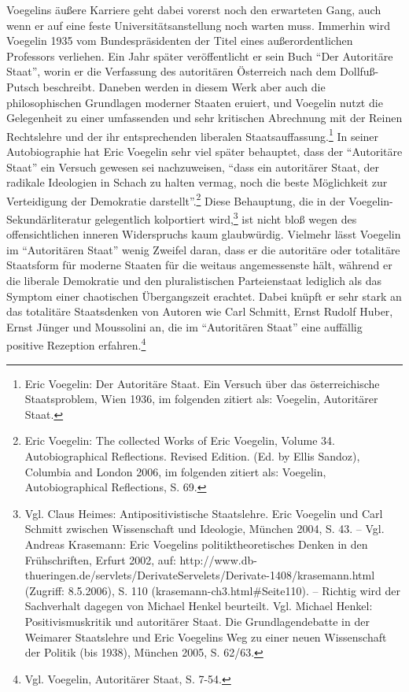\documentclass[12pt,a4paper,ngerman]{article}
\begin{document}
Voegelins äußere Karriere geht dabei vorerst noch den erwarteten Gang, auch
wenn er auf eine feste Universitätsanstellung noch warten muss.
Immerhin wird Voegelin 1935 vom Bundespräsidenten der Titel eines
außerordentlichen Professors verliehen. Ein Jahr später veröffentlicht er
sein Buch "`Der Autoritäre Staat"', worin er die Verfassung des autoritären
Österreich nach dem Dollfuß-Putsch beschreibt.  Daneben werden in diesem Werk
aber auch die philosophischen Grundlagen moderner Staaten eruiert, und
Voegelin nutzt die Gelegenheit zu einer umfassenden und sehr kritischen
Abrechnung mit der Reinen Rechtslehre und der ihr entsprechenden liberalen
Staatsauffassung.\footnote{Eric Voegelin: Der Autoritäre Staat.  Ein Versuch
  über das österreichische Staatsproblem, Wien 1936, im folgenden zitiert als:
  Voegelin, Autoritärer Staat.} In seiner Autobiographie hat Eric Voegelin
sehr viel später behauptet, dass der "`Autoritäre Staat"' ein Versuch gewesen
sei nachzuweisen, "`dass ein autoritärer Staat, der radikale Ideologien in
Schach zu halten vermag, noch die beste Möglichkeit zur Verteidigung der
Demokratie darstellt"'.\footnote{Eric Voegelin: The collected Works of Eric
  Voegelin, Volume 34.  Autobiographical Reflections. Revised Edition.  (Ed.
  by Ellis Sandoz), Columbia and London 2006, im folgenden zitiert als:
  Voegelin, Autobiographical Reflections, S. 69.} Diese Behauptung, die in der
Voegelin-Sekundärliteratur gelegentlich kolportiert wird,\footnote{Vgl.  Claus
  Heimes: Antipositivistische Staatslehre. Eric Voegelin und Carl Schmitt
  zwischen Wissenschaft und Ideologie, München 2004, S. 43. -- Vgl.  Andreas
  Krasemann: Eric Voegelins politiktheoretisches Denken in den Frühschriften,
  Erfurt 2002, auf:
  http://www.db-thueringen.de/servlets/DerivateServelets/Derivate-1408/krasemann.html
  (Zugriff: 8.5.2006), S. 110 (krasemann-ch3.html\#Seite110).  -- Richtig wird
  der Sachverhalt dagegen von Michael Henkel beurteilt.  Vgl. Michael Henkel:
  Positivismuskritik und autoritärer Staat. Die Grundlagendebatte in der
  Weimarer Staatslehre und Eric Voegelins Weg zu einer neuen Wissenschaft der
  Politik (bis 1938), München 2005, S.  62/63.} ist nicht bloß wegen des
offensichtlichen inneren Widerspruchs kaum glaubwürdig.  Vielmehr lässt
Voegelin im "`Autoritären Staat"' wenig Zweifel daran, dass er die autoritäre
oder totalitäre Staatsform für moderne Staaten für die weitaus angemessenste
hält, während er die liberale Demokratie und den pluralistischen Parteienstaat
lediglich als das Symptom einer chaotischen Übergangszeit erachtet. Dabei
knüpft er sehr stark an das totalitäre Staatsdenken von Autoren wie Carl
Schmitt, Ernst Rudolf Huber, Ernst Jünger und Moussolini an, die im
"`Autoritären Staat"' eine auffällig positive Rezeption
erfahren.\footnote{Vgl. Voegelin, Autoritärer Staat, S. 7-54.}
\end{document}
